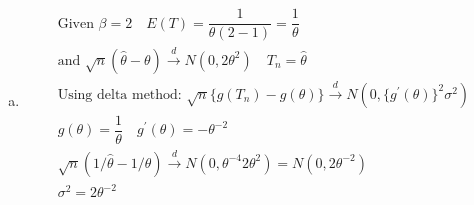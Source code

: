 \documentclass{article}
\newcommand{\cd}{\overset{d}{\to}}
\newcommand{\B}{\beta}
\begin{document}
\begin{flushleft}
\begin{enumerate}[(a)]
	\item 
\begin{multline*}\\
\text{Given } \B=2 \quad E(T)=\dfrac{1}{\theta(2-1)}=\dfrac{1}{\theta}\\
\text{and } \sqrt{n}(\hat{\theta}-\theta)\cd N(0,2\theta^2) \quad T_n=\hat{\theta}\\
\text{Using delta method: }
\sqrt{n}\{g(T_n)-g(\theta)\}\cd N(0,\{g^{'}(\theta)\}^2 \sigma^2)\\
g(\theta)=\dfrac{1}{\theta} \quad g^{'}(\theta)=-\theta^{-2}\\
\sqrt{n}(1/\hat{\theta}-1/\theta)\cd N(0,\theta^{-4}2\theta^2)=N(0,2\theta^{-2})\\
\sigma^2=2\theta^{-2}\\
\end{multline*}

\end{enumerate}

\end{flushleft}
\end{document}
